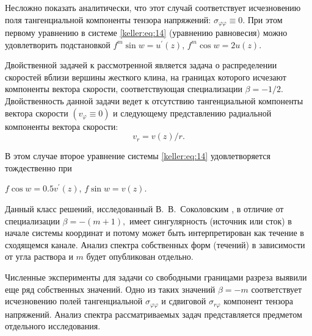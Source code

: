 Несложно показать аналитически, что этот случай соответствует исчезновению поля тангенциальной компоненты тензора напряжений: $\sigma_{\varphi\varphi}\equiv0.$ При этом первому уравнению в системе \eqref{keller:eq:14} (уравнению равновесия) можно удовлетворить подстановкой $f^m\sin w=u^\prime(z)$, $f^m\cos w=2u(z).$ 



Двойственной задачей к рассмотренной является задача о распределении скоростей вблизи вершины жесткого клина, на границах которого исчезают компоненты вектора скорости, соответствующая специализации $\beta = -{1}/{2}.$ Двойственность данной задачи ведет к отсутствию тангенциальной компоненты вектора скорости $(v_\varphi\equiv 0)$ и следующему представлению радиальной компоненты вектора скорости: $$v_r={v(z)}/{r}.$$ 

В этом случае  второе уравнение  системы \eqref{keller:eq:14} удовлетворяется тождественно при 

$f\cos w=0.5v^\prime(z)$, $f\sin w=v(z).$ 

Данный класс решений, исследованный В.~В.~Соколовским \cite{keller:bib:Sokol1, keller:bib:Sokol2}, в отличие от специализации $\beta = -(m+1),$ имеет сингулярность (источник или сток) в начале системы координат и потому может быть интерпретирован как течение в сходящемся канале. Анализ спектра собственных форм (течений) в зависимости от угла раствора и $m$ будет опубликован отдельно.



Численные эксперименты для задачи со свободными границами разреза выявили еще ряд собственных значений. Одно из таких значений $\beta=-m$ соответствует исчезновению полей тангенциальной $\sigma_{\varphi\varphi}$ и сдвиговой $\sigma_{r\varphi}$ компонент тензора напряжений. Анализ спектра рассматриваемых задач представляется предметом отдельного исследования.



\smallskip



